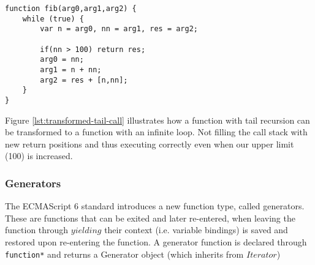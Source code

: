 \begin{lstlisting}[caption={Semantically identical function, without tail recursion},label={lst:transformed-tail-call}]
function fib(arg0,arg1,arg2) {
	while (true) {
		var n = arg0, nn = arg1, res = arg2;

		if(nn > 100) return res;
		arg0 = nn;
		arg1 = n + nn;
		arg2 = res + [n,nn];
	}
}
\end{lstlisting}

Figure \ref{lst:transformed-tail-call} illustrates how a function with tail recursion can be transformed to a function with an infinite loop. Not filling the call stack with new return positions and thus executing correctly even when our upper limit (100) is increased.

\subsubsection{Generators}
The ECMAScript 6 standard introduces a new function type, called generators\cite[14.4]{SpecJS}. These are functions that can be exited and later re-entered, when leaving the function through $yielding$ their context (i.e. variable bindings) is saved and restored upon re-entering the function. A generator function is declared through \lstinline$function*$ and returns a Generator object (which inherits from $Iterator$)

